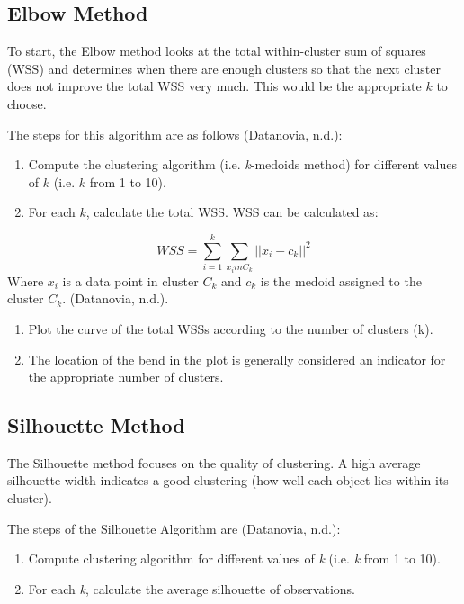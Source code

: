 \documentclass[12pt,twoside]{amherstthesis}
\begin{document}
  \subsection{Elbow Method}\label{elbow-method}
  
  To start, the Elbow method looks at the total within-cluster sum of
  squares (WSS) and determines when there are enough clusters so that the
  next cluster does not improve the total WSS very much. This would be the
  appropriate \(k\) to choose.
  
  The steps for this algorithm are as follows (Datanovia, n.d.):
  
  \begin{enumerate}
  \def\labelenumi{\arabic{enumi}.}
  \item
    Compute the clustering algorithm (i.e. \emph{k}-medoids method) for
    different values of \(k\) (i.e. \(k\) from 1 to 10).
  \item
    For each \(k\), calculate the total WSS. WSS can be calculated as:
  \end{enumerate}
  
  \[WSS= \sum_{i=1}^k \sum_{x_i in C_k} ||{{x_i- c_k}}||^2\] Where \(x_i\)
  is a data point in cluster \(C_k\) and \(c_k\) is the medoid assigned to
  the cluster \(C_k\). (Datanovia, n.d.).
  
  \begin{enumerate}
  \def\labelenumi{\arabic{enumi}.}
  \setcounter{enumi}{2}
  \item
    Plot the curve of the total WSSs according to the number of clusters
    (k).
  \item
    The location of the bend in the plot is generally considered an
    indicator for the appropriate number of clusters.
  \end{enumerate}
  
  \subsection{Silhouette Method}\label{silhouette-method}
  
  The Silhouette method focuses on the quality of clustering. A high
  average silhouette width indicates a good clustering (how well each
  object lies within its cluster).
  
  The steps of the Silhouette Algorithm are (Datanovia, n.d.):
  
  \begin{enumerate}
  \def\labelenumi{\arabic{enumi}.}
  \item
    Compute clustering algorithm for different values of \emph{k} (i.e.
    \emph{k} from 1 to 10).
  \item
    For each \emph{k}, calculate the average silhouette of observations.
  \end{enumerate}
  
\end{document}
